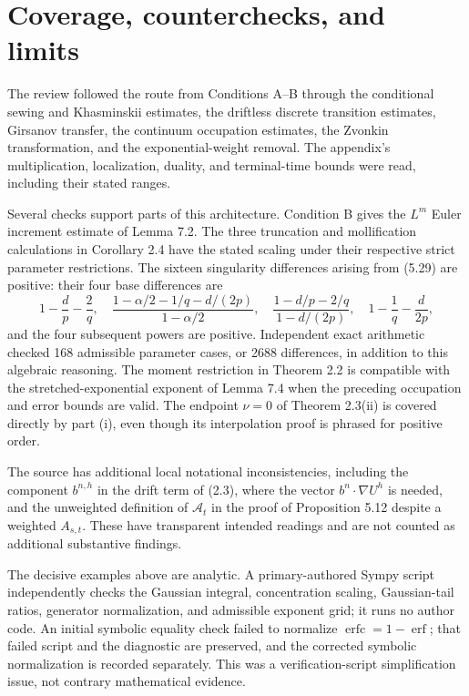 \documentclass[10pt]{article}
\begin{document}
\section*{Coverage, counterchecks, and limits}
The review followed the route from Conditions A–B through the conditional sewing and Khasminskii estimates, the driftless discrete transition estimates, Girsanov transfer, the continuum occupation estimates, the Zvonkin transformation, and the exponential-weight removal. The appendix’s multiplication, localization, duality, and terminal-time bounds were read, including their stated ranges.\par
Several checks support parts of this architecture. Condition B gives the \(L^m\) Euler increment estimate of Lemma 7.2. The three truncation and mollification calculations in Corollary 2.4 have the stated scaling under their respective strict parameter restrictions. The sixteen singularity differences arising from (5.29) are positive: their four base differences are \[1-\frac dp-\frac2q,\quad
\frac{1-\alpha/2-1/q-d/(2p)}{1-\alpha/2},\quad
\frac{1-d/p-2/q}{1-d/(2p)},\quad
1-\frac1q-\frac d{2p},\] and the four subsequent powers are positive. Independent exact arithmetic checked 168 admissible parameter cases, or 2688 differences, in addition to this algebraic reasoning. The moment restriction in Theorem 2.2 is compatible with the stretched-exponential exponent of Lemma 7.4 when the preceding occupation and error bounds are valid. The endpoint \(\nu=0\) of Theorem 2.3(ii) is covered directly by part (i), even though its interpolation proof is phrased for positive order.\par
The source has additional local notational inconsistencies, including the component \(b^{n,h}\) in the drift term of (2.3), where the vector \(b^n\cdot\nabla U^h\) is needed, and the unweighted definition of \(\mathcal A_t\) in the proof of Proposition 5.12 despite a weighted \(A_{s,t}\). These have transparent intended readings and are not counted as additional substantive findings.\par
The decisive examples above are analytic. A primary-authored Sympy script independently checks the Gaussian integral, concentration scaling, Gaussian-tail ratios, generator normalization, and admissible exponent grid; it runs no author code. An initial symbolic equality check failed to normalize \(\operatorname{erfc}=1-\operatorname{erf}\); that failed script and the diagnostic are preserved, and the corrected symbolic normalization is recorded separately. This was a verification-script simplification issue, not contrary mathematical evidence.\par
\end{document}

